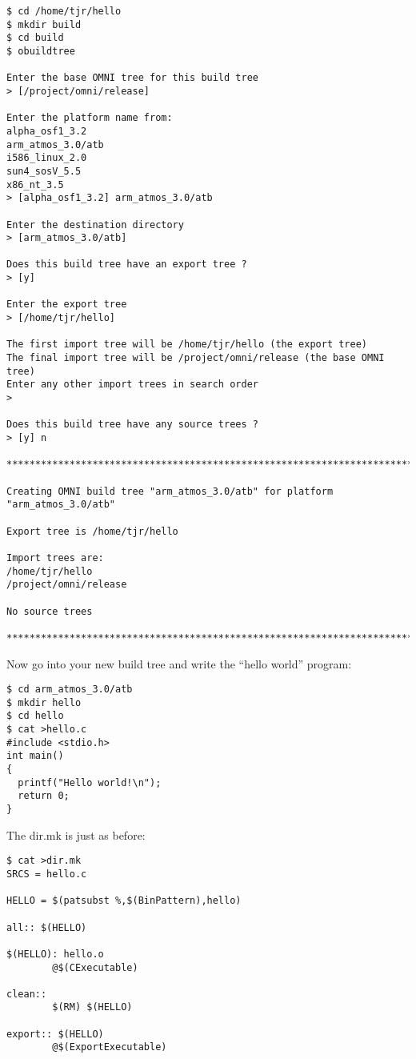 \documentclass[11pt,twoside,onecolumn]{article}
\begin{document}
{\small \begin{verbatim}
$ cd /home/tjr/hello
$ mkdir build
$ cd build
$ obuildtree

Enter the base OMNI tree for this build tree
> [/project/omni/release] 

Enter the platform name from:
alpha_osf1_3.2
arm_atmos_3.0/atb
i586_linux_2.0
sun4_sosV_5.5
x86_nt_3.5
> [alpha_osf1_3.2] arm_atmos_3.0/atb

Enter the destination directory
> [arm_atmos_3.0/atb] 

Does this build tree have an export tree ?
> [y] 

Enter the export tree
> [/home/tjr/hello] 

The first import tree will be /home/tjr/hello (the export tree)
The final import tree will be /project/omni/release (the base OMNI tree)
Enter any other import trees in search order
> 

Does this build tree have any source trees ?
> [y] n

************************************************************************

Creating OMNI build tree "arm_atmos_3.0/atb" for platform "arm_atmos_3.0/atb"

Export tree is /home/tjr/hello

Import trees are:
/home/tjr/hello
/project/omni/release

No source trees

************************************************************************

\end{verbatim}}

Now go into your new build tree and write the ``hello world'' program:

{\small \begin{verbatim}
$ cd arm_atmos_3.0/atb 
$ mkdir hello
$ cd hello
$ cat >hello.c
#include <stdio.h>
int main()
{
  printf("Hello world!\n");
  return 0;
}
\end{verbatim}}

The dir.mk is just as before:

{\small \begin{verbatim}
$ cat >dir.mk
SRCS = hello.c

HELLO = $(patsubst %,$(BinPattern),hello)

all:: $(HELLO)

$(HELLO): hello.o
        @$(CExecutable)

clean::
        $(RM) $(HELLO)

export:: $(HELLO)
        @$(ExportExecutable)
\end{verbatim}}
\end{document}

